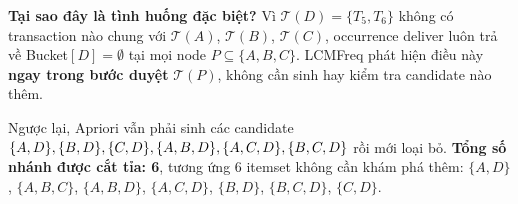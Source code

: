 \documentclass[12pt,a4paper]{article}
\newcommand{\supp}{\mathrm{sup}}
\theoremstyle{definition}
\begin{document}
\textbf{Tại sao đây là tình huống đặc biệt?}
Vì $\mathcal{T}(D) = \{T_5,T_6\}$ không có transaction nào chung với
$\mathcal{T}(A)$, $\mathcal{T}(B)$, $\mathcal{T}(C)$, occurrence deliver
luôn trả về Bucket$[D] = \emptyset$ tại mọi node $P \subseteq \{A,B,C\}$.
LCMFreq phát hiện điều này \textbf{ngay trong bước duyệt}
$\mathcal{T}(P)$, không cần sinh hay kiểm tra candidate nào thêm.

Ngược lại, Apriori vẫn phải sinh các candidate
$\{A,D\},\{B,D\},\{C,D\},\{A,B,D\},\{A,C,D\}, \\ \{B,C,D\}$
rồi mới loại bỏ. \textbf{Tổng số nhánh được cắt tỉa: 6},
tương ứng 6 itemset không cần khám phá thêm:
$\{A,D\}$, $\{A,B,C\}$, $\{A,B,D\}$, $\{A,C,D\}$,
$\{B,D\}$, $\{B,C,D\}$, $\{C,D\}$.



\end{document}
